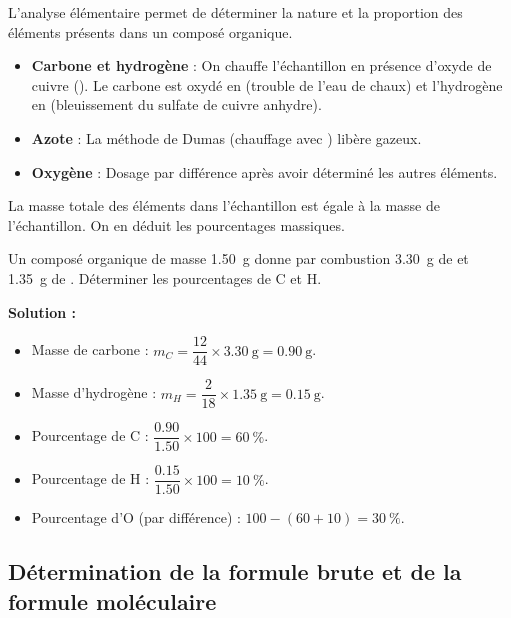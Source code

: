 \begin{experience}
L'analyse élémentaire permet de déterminer la nature et la proportion des éléments présents dans un composé organique.
\begin{itemize}
    \item \textbf{Carbone et hydrogène} : On chauffe l'échantillon en présence d'oxyde de cuivre (). Le carbone est oxydé en  (trouble de l'eau de chaux) et l'hydrogène en  (bleuissement du sulfate de cuivre anhydre).
    \item \textbf{Azote} : La méthode de Dumas (chauffage avec ) libère  gazeux.
    \item \textbf{Oxygène} : Dosage par différence après avoir déterminé les autres éléments.
\end{itemize}
\end{experience}

\begin{loi}
La masse totale des éléments dans l'échantillon est égale à la masse de l'échantillon. On en déduit les pourcentages massiques.
\end{loi}

\begin{exemple}
Un composé organique de masse \SI{1.50}{\gram} donne par combustion \SI{3.30}{\gram} de  et \SI{1.35}{\gram} de . Déterminer les pourcentages de C et H.

\noindent \textbf{Solution :}
\begin{itemize}
    \item Masse de carbone : $m_C = \dfrac{12}{44} \times \SI{3.30}{\gram} = \SI{0.90}{\gram}$.
    \item Masse d'hydrogène : $m_H = \dfrac{2}{18} \times \SI{1.35}{\gram} = \SI{0.15}{\gram}$.
    \item Pourcentage de C : $\dfrac{0.90}{1.50} \times 100 = \SI{60}{\%}$.
    \item Pourcentage de H : $\dfrac{0.15}{1.50} \times 100 = \SI{10}{\%}$.
    \item Pourcentage d'O (par différence) : $100 - (60 + 10) = \SI{30}{\%}$.
\end{itemize}
\end{exemple}

\subsection{Détermination de la formule brute et de la formule moléculaire}

